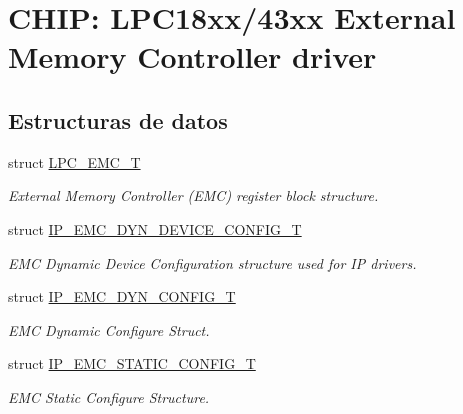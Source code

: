 \hypertarget{group___e_m_c__18_x_x__43_x_x}{}\section{C\+H\+IP\+: L\+P\+C18xx/43xx External Memory Controller driver}
\label{group___e_m_c__18_x_x__43_x_x}
\subsection*{Estructuras de datos}
\begin{DoxyCompactItemize}
\item 
struct \hyperlink{struct_l_p_c___e_m_c___t}{L\+P\+C\+\_\+\+E\+M\+C\+\_\+T}
\begin{DoxyCompactList}\small\item\em External Memory Controller (E\+MC) register block structure. \end{DoxyCompactList}\item 
struct \hyperlink{struct_i_p___e_m_c___d_y_n___d_e_v_i_c_e___c_o_n_f_i_g___t}{I\+P\+\_\+\+E\+M\+C\+\_\+\+D\+Y\+N\+\_\+\+D\+E\+V\+I\+C\+E\+\_\+\+C\+O\+N\+F\+I\+G\+\_\+T}
\begin{DoxyCompactList}\small\item\em E\+MC Dynamic Device Configuration structure used for IP drivers. \end{DoxyCompactList}\item 
struct \hyperlink{struct_i_p___e_m_c___d_y_n___c_o_n_f_i_g___t}{I\+P\+\_\+\+E\+M\+C\+\_\+\+D\+Y\+N\+\_\+\+C\+O\+N\+F\+I\+G\+\_\+T}
\begin{DoxyCompactList}\small\item\em E\+MC Dynamic Configure Struct. \end{DoxyCompactList}\item 
struct \hyperlink{struct_i_p___e_m_c___s_t_a_t_i_c___c_o_n_f_i_g___t}{I\+P\+\_\+\+E\+M\+C\+\_\+\+S\+T\+A\+T\+I\+C\+\_\+\+C\+O\+N\+F\+I\+G\+\_\+T}
\begin{DoxyCompactList}\small\item\em E\+MC Static Configure Structure. \end{DoxyCompactList}\end{DoxyCompactItemize}
